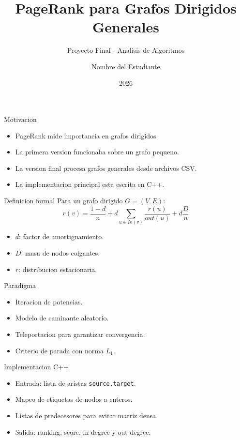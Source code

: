 \documentclass{beamer}
\title{PageRank para Grafos Dirigidos Generales}
\subtitle{Proyecto Final - Analisis de Algoritmos}
\author{Nombre del Estudiante}
\institute{Yachay Tech University}
\date{2026}
\begin{document}
\begin{frame}
  \titlepage
\end{frame}

\begin{frame}{Motivacion}
  \begin{itemize}
    \item PageRank mide importancia en grafos dirigidos.
    \item La primera version funcionaba sobre un grafo pequeno.
    \item La version final procesa grafos generales desde archivos CSV.
    \item La implementacion principal esta escrita en C++.
  \end{itemize}
\end{frame}

\begin{frame}{Definicion formal}
  Para un grafo dirigido $G=(V,E)$:
  \[
    r(v)=\frac{1-d}{n}+d\sum_{u\in In(v)}\frac{r(u)}{out(u)}+d\frac{D}{n}
  \]
  \begin{itemize}
    \item $d$: factor de amortiguamiento.
    \item $D$: masa de nodos colgantes.
    \item $r$: distribucion estacionaria.
  \end{itemize}
\end{frame}

\begin{frame}{Paradigma}
  \begin{itemize}
    \item Iteracion de potencias.
    \item Modelo de caminante aleatorio.
    \item Teleportacion para garantizar convergencia.
    \item Criterio de parada con norma $L_1$.
  \end{itemize}
\end{frame}

\begin{frame}{Implementacion C++}
  \begin{itemize}
    \item Entrada: lista de aristas \texttt{source,target}.
    \item Mapeo de etiquetas de nodos a enteros.
    \item Listas de predecesores para evitar matriz densa.
    \item Salida: ranking, score, in-degree y out-degree.
  \end{itemize}
\end{frame}
\end{document}
